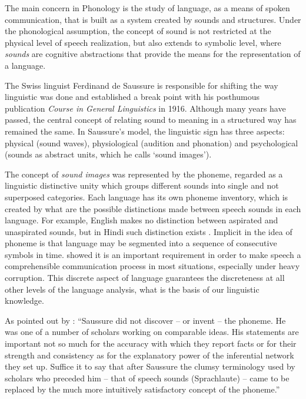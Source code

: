 The main concern in Phonology is the study of language, as a means of spoken communication, that is built as a system
created by sounds and structures. Under the phonological assumption, 
the concept of sound is not restricted at the physical level of speech
realization, but also extends to symbolic level, where \textit{sounds} are cognitive abstractions
that provide the means for the representation of a language.

The Swiss linguist Ferdinand de Saussure is responsible for
shifting the way linguistic was done and established a break point with his posthumous
publication \textit{Course in General Linguistics} in 1916.
Although many years have passed, the central concept of relating sound to meaning in a structured way 
has remained the same. In Saussure's model, the linguistic sign has three aspects: 
physical (sound waves), physiological (audition and phonation) and psychological (sounds as abstract units,
which he calls `sound images').

The concept of \textit{sound images} was represented by the phoneme, regarded as a linguistic distinctive unity
which groups different sounds into single and not superposed categories.
Each language has its own phoneme inventory, which is created by what are the possible distinctions made between 
speech sounds in each language. For example, English makes no distinction between aspirated and unaspirated sounds,
but in Hindi such distinction exists \citep{ladefoged1996}.
Implicit in the idea of phoneme is that language may be segmented into a sequence of
consecutive symbols in time. %
\citet{mandelbrot} showed it is an important requirement
in order to make speech a comprehensible communication process in most situations,
especially under heavy corruption. This discrete aspect of language guarantees the discreteness at all other levels
of the language analysis, what is the basis of our linguistic knowledge.


As pointed out by \citet{capek1983}: ``Saussure did not discover -- or invent -- the phoneme.
He was one of a number of scholars working on comparable ideas. His statements are
important not so much for the accuracy with which they report facts or for their strength
and consistency as for the explanatory power of the inferential network they set up. Suffice
it to say that after Saussure the clumsy terminology used by scholars who preceded him --
that of speech sounds (Sprachlaute) -- came to be replaced by the much more intuitively
satisfactory concept of the phoneme.''


